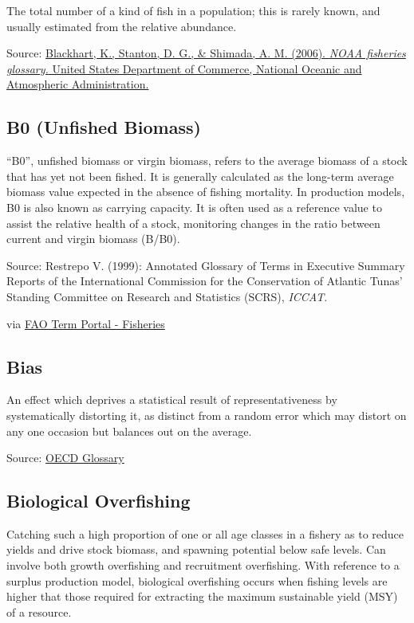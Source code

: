\documentclass[
  11pt,
]{book}
\begin{document}
The total number of a kind of ﬁsh in a population; this is rarely known, and usually estimated from the relative abundance.

Source: \href{https://repository.library.noaa.gov/view/noaa/12856}{Blackhart, K., Stanton, D. G., \& Shimada, A. M. (2006). \emph{NOAA fisheries glossary.} United States Department of Commerce, National Oceanic and Atmospheric Administration.}

\hypertarget{b0-unfished-biomass}{%
\subsection{B0 (Unfished Biomass)}\label{b0-unfished-biomass}}

``B0'', unfished biomass or virgin biomass, refers to the average biomass of a stock that has yet not been fished. It is generally calculated as the long-term average biomass value expected in the absence of fishing mortality. In production models, B0 is also known as carrying capacity. It is often used as a reference value to assist the relative health of a stock, monitoring changes in the ratio between current and virgin biomass (B/B0).

Source: Restrepo V. (1999): Annotated Glossary of Terms in Executive Summary Reports of the International Commission for the Conservation of Atlantic Tunas' Standing Committee on Research and Statistics (SCRS), \emph{ICCAT}.

via \href{http://www.fao.org/fishery/glossary/en}{FAO Term Portal - Fisheries}

\hypertarget{bias}{%
\subsection{Bias}\label{bias}}

An effect which deprives a statistical result of representativeness by systematically distorting it, as distinct from a random error which may distort on any one occasion but balances out on the average.

Source: \href{https://stats.oecd.org/glossary/detail.asp?ID=3605}{OECD Glossary}

\hypertarget{biological-overfishing}{%
\subsection{Biological Overfishing}\label{biological-overfishing}}

Catching such a high proportion of one or all age classes in a fishery as to reduce yields and drive stock biomass, and spawning potential below safe levels. Can involve both growth overfishing and recruitment overfishing. With reference to a surplus production model, biological overfishing occurs when fishing levels are higher that those required for extracting the maximum sustainable yield (MSY) of a resource.
\end{document}
